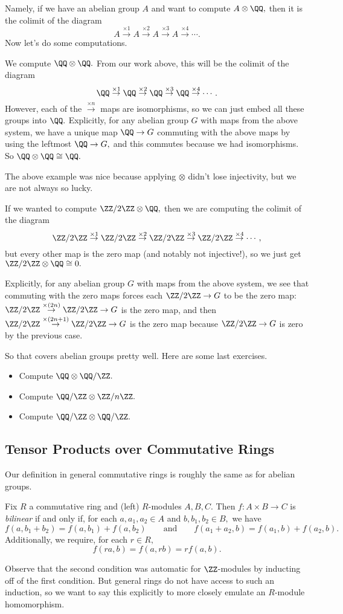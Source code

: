 Namely, if we have an abelian group $A$ and want to compute $A\otimes\QQ,$ then it is the colimit of the diagram
\[A\stackrel{\times1}\to A\stackrel{\times2}\to A\stackrel{\times3}\to A\stackrel{\times4}\to\cdots.\]
Now let's do some computations.
\begin{example}
	We compute $\QQ\otimes\QQ.$ From our work above, this will be the colimit of the diagram
	\[\QQ\stackrel{\times1}\to \QQ\stackrel{\times2}\to \QQ\stackrel{\times3}\to \QQ\stackrel{\times4}\to\cdots.\]
	However, each of the $\stackrel{\times n}\to$ maps are isomorphisms, so we can just embed all these groups into $\QQ.$ Explicitly, for any abelian group $G$ with maps from the above system, we have a unique map $\QQ\to G$ commuting with the above maps by using the leftmost $\QQ\to G,$ and this commutes because we had isomorphisms. So $\QQ\otimes\QQ\cong\QQ.$
\end{example}
The above example was nice because applying $\otimes$ didn't lose injectivity, but we are not always so lucky.
\begin{example}
	If we wanted to compute $\ZZ/2\ZZ\otimes\QQ,$ then we are computing the colimit of the diagram
	\[\ZZ/2\ZZ\stackrel{\times1}\to \ZZ/2\ZZ\stackrel{\times2}\to \ZZ/2\ZZ\stackrel{\times3}\to \ZZ/2\ZZ\stackrel{\times4}\to\cdots,\]
	but every other map is the zero map (and notably not injective!), so we just get $\ZZ/2\ZZ\otimes\QQ\cong0.$
	
	Explicitly, for any abelian group $G$ with maps from the above system, we see that commuting with the zero maps forces each $\ZZ/2\ZZ\to G$ to be the zero map: $\ZZ/2\ZZ\stackrel{\times(2n)}\to\ZZ/2\ZZ\to G$ is the zero map, and then $\ZZ/2\ZZ\stackrel{\times(2n+1)}\to\ZZ/2\ZZ\to G$ is the zero map because $\ZZ/2\ZZ\to G$ is zero by the previous case.
\end{example}
So that covers abelian groups pretty well. Here are some last exercises.
\begin{itemize}
	\item Compute $\QQ\otimes\QQ/\ZZ.$
	\item Compute $\QQ/\ZZ\otimes\ZZ/n\ZZ.$
	\item Compute $\QQ/\ZZ\otimes\QQ/\ZZ.$
\end{itemize}

\subsection{Tensor Products over Commutative Rings}
Our definition in general commutative rings is roughly the same as for abelian groups.
\begin{defi}[Bilinear]
	Fix $R$ a commutative ring and (left) $R$-modules $A,B,C.$ Then $f:A\times B\to C$ is \textit{bilinear} if and only if, for each $a,a_1,a_2\in A$ and $b,b_1,b_2\in B,$ we have
	\[f(a,b_1+b_2)=f(a,b_1)+f(a,b_2)\qquad\text{and}\qquad f(a_1+a_2,b)=f(a_1,b)+f(a_2,b).\]
	Additionally, we require, for each $r\in R,$
	\[f(ra,b)=f(a,rb)=rf(a,b).\]
\end{defi}
Observe that the second condition was automatic for $\ZZ$-modules by inducting off of the first condition. But general rings do not have access to such an induction, so we want to say this explicitly to more closely emulate an $R$-module homomorphism.

